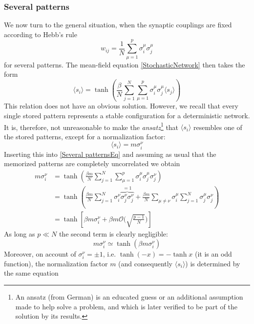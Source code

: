 \subsubsection{Several patterns}
We now turn to the general situation, when the synaptic couplings are fixed according to Hebb's rule
\begin{equation}
w_{ij}=\frac{1}{N}\sum_{\mu=1}^p\sigma_i^\mu\sigma_j^\mu
\end{equation}
for several patterns. The mean-field equation \eqref{StochasticNetwork} then takes the form
\begin{equation}\label{Several patternsEq}
\langle s_i\rangle=\tanh{\left(\frac{\beta}{N}\sum_{j=1}^N\sum_{\mu=1}^p\sigma_i^\mu\sigma_j^\mu\langle s_j\rangle\right)}
\end{equation}
This relation does not have an obvious solution. However, we recall that every single stored pattern represents a stable configuration for a deterministic network. It is, therefore, not unreasonable to make the \emph{ansatz}\footnote{An ansatz (from German) is an educated guess or an additional assumption made to help solve a problem, and which is later verified to be part of the solution by its results.} that $\langle s_i\rangle$ resembles one of the stored patterns, except for a normalization factor:
\begin{equation}
\langle s_i\rangle=m\sigma_i^\nu
\end{equation}
Inserting this into \eqref{Several patternsEq} and assuming as usual that the memorized patterns are completely uncorrelated we obtain
\begin{equation}
\begin{split}
m\sigma_i^\nu&=\tanh{\left(\frac{\beta m}{N}\sum_{j=1}^N\sum_{\mu=1}^p\sigma_i^\mu\sigma_j^\mu\sigma_j^\nu\right)}\\
&=\tanh{\left(\frac{\beta m}{N}\sum_{j=1}^N\sigma_i^\nu\overbrace{\sigma_j^\nu\sigma_j^\nu}^{=1}+\frac{\beta m}{N}\sum_{\mu\neq\nu}\sigma_i^\mu\sum_{j=1}^N\sigma_j^\mu\sigma_j^\nu\right)}\\
&=\tanh{\left[\beta m\sigma_i^\nu+\beta m\mathcal{O}\Biggl(\sqrt{\frac{p-1}{N}}\Biggr)\right]}
\end{split}
\end{equation}
As long as $p\ll N$ the second term is clearly negligible:
\begin{equation}
m\sigma_i^\nu\simeq\tanh{(\beta m\sigma_i^\nu)}
\end{equation}
Moreover, on account of $\sigma_i^\nu=\pm1$, i.e. $\tanh{(-x)}=-\tanh{x}$ (it is an odd function), the normalization factor $m$ (and consequently $\langle s_i\rangle$) is determined by the same equation
